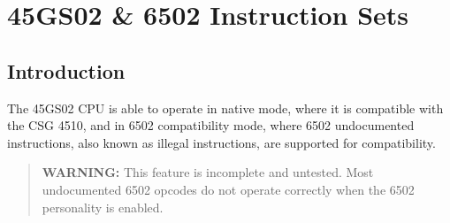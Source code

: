 \begingroup
\newcommand{\OPC}[4]{\makecell{\begin{tabular}{>{\raggedright\arraybackslash}p{0.4cm}>{\raggedleft\arraybackslash}p{0.8cm}}
\fontsize{8pt}{0pt}\selectfont #3 & \fontsize{8pt}{0pt}\selectfont {\em #4} \\[-3pt]
\multicolumn{2}{c}{\fontsize{10pt}{0pt}\selectfont #1} \\[-3pt]
\multicolumn{2}{c}{\fontsize{8pt}{0pt}\selectfont #2}
\end{tabular}}}
\newcommand{\OPCQ}[4]{\makecell{\begin{tabular}{>{\raggedright\arraybackslash}p{0.4cm}>{\raggedleft\arraybackslash}p{0.8cm}}
\fontsize{8pt}{0pt}\selectfont #3 & \fontsize{8pt}{0pt}\selectfont {\em #4} \\[-3pt]
\multicolumn{2}{c}{\fontsize{10pt}{0pt}\selectfont #1} \\[-3pt]
\multicolumn{2}{c}{\fontsize{8pt}{0pt}\selectfont #2} \\[-12pt]
\fontsize{8pt}{0pt}\selectfont Q
\end{tabular}}}
\newcommand{\OPill}{\cellcolor[rgb]{1,.8,.8}}
\newcommand{\OPfar}{\cellcolor[rgb]{.8,1,.8}}
\newcommand{\OPquad}{\cellcolor[rgb]{.8,.8,1}}
\newcommand{\OPfarq}{\cellcolor[rgb]{.8,1,1}}
\newcommand{\binand}{$\mathit{AND}$}
\newcommand{\binor}{$\mathit{OR}$}
\newcommand{\binxor}{$\mathit{XOR}$}
\newcommand{\binnot}{$\mathit{NOT}$}
\newcommand{\binneg}{$\mathit{NEG}$}

\chapter{45GS02 \& 6502 Instruction Sets}

\section{Introduction}

The 45GS02 CPU is able to operate in native mode, where it
is compatible with the CSG 4510, and in 6502 compatibility mode,
where 6502 undocumented instructions, also known as illegal
instructions, are supported for compatibility.

\begin{quote}
{\bf WARNING:} This feature is incomplete and untested.  Most undocumented
6502 opcodes do not operate correctly when the 6502 personality is enabled.
\end{quote}

